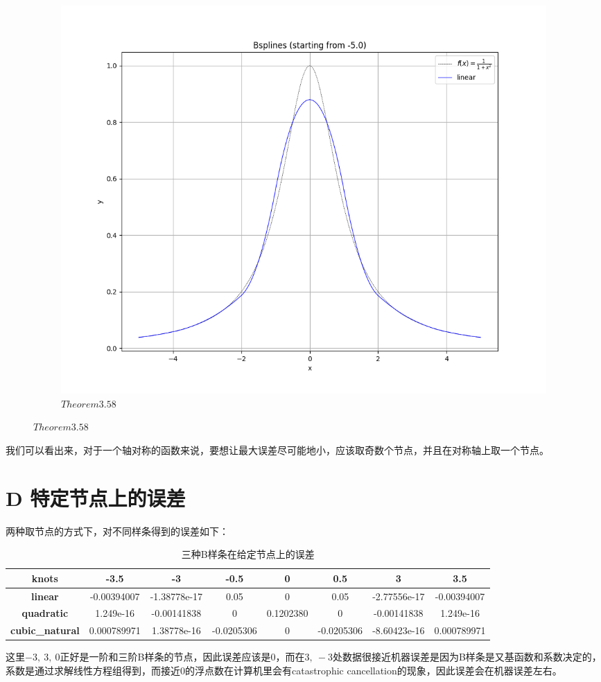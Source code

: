\documentclass[UTF8]{ctexart}
\begin{document}
	\begin{figure}[H]
		\centering
		\begin{subfigure}[b]{0.45\textwidth}
			\centering
			\includegraphics[width=\textwidth]{../figure/C_3.png}
			\caption{$Theorem 3.58$}
			\label{$S_2^1$样条拟合函数}
		\end{subfigure}
	\end{figure}
	我们可以看出来，对于一个轴对称的函数来说，要想让最大误差尽可能地小，应该取奇数个节点，并且在对称轴上取一个节点。
	\section{D 特定节点上的误差}
	两种取节点的方式下，对不同样条得到的误差如下：
\begin{table}[H]
	\centering
	\begin{tabular}{|c|c|c|c|c|c|c|c|}
		\hline
		\textbf{knots} & -3.5 & -3 & -0.5 & 0 & 0.5 & 3 & 3.5 \\
		\hline
		\textbf{linear} & -0.00394007 & -1.38778e-17 & 0.05 & 0 & 0.05 & -2.77556e-17 & -0.00394007 \\
		\hline
		\textbf{quadratic} & 1.249e-16 & -0.00141838 & 0 & 0.1202380 & 0 & -0.00141838 &  1.249e-16  \\
		\hline
		\textbf{cubic\_natural} & 0.000789971 & 1.38778e-16 & -0.0205306 & 0 & -0.0205306 & -8.60423e-16 & 0.000789971 \\
		\hline
	\end{tabular}
	\caption{三种B样条在给定节点上的误差}
\end{table}
	这里$-3,\ 3,\ 0$正好是一阶和三阶B样条的节点，因此误差应该是0，而在$3,\ -3$处数据很接近机器误差是因为B样条是又基函数和系数决定的，系数是通过求解线性方程组得到，而接近0的浮点数在计算机里会有catastrophic cancellation的现象，因此误差会在机器误差左右。
	
\end{document}
